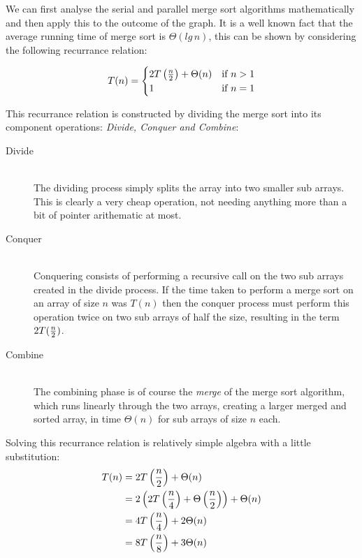 \documentclass[12pt,twoside,notitlepage]{report}
\begin{document}
We can first analyse the serial and parallel merge sort algorithms mathematically and then apply this to the outcome of the graph. It is a well known fact that the average running time of merge sort is $\Theta(lg\,{n})$, this can be
shown by considering the following recurrance relation:

\[
T(n) = 
    \begin{cases}
    2T\left({n \over 2}\right) + \Theta(n) & \text{if } n > 1 \\
    1 & \text{if } n = 1
    \end{cases}
\]

This recurrance relation is constructed by dividing the merge sort into its component operations: {\em Divide, Conquer and Combine}:

\begin{description}

\item[Divide] \hfill \\
The dividing process simply splits the array into two smaller sub arrays. This is clearly a very cheap operation, not needing anything more than a bit of pointer arithematic at most.

\item[Conquer] \hfill \\
Conquering consists of performing a recursive call on the two sub arrays created in the divide process. If the time taken to perform a merge sort on an array of size $n$ was $T(n)$ then the conquer process must perform this operation
twice on two sub arrays of half the size, resulting in the term $2T({n \over 2})$.

\item[Combine] \hfill \\
The combining phase is of course the {\em merge} of the merge sort algorithm, which runs linearly through the two arrays, creating a larger merged and sorted array, in time $\Theta(n)$ for sub arrays of size $n$ each.

\end{description}

Solving this recurrance relation is relatively simple algebra with a little substitution:
\begin{align*}
T(n) &= 2T\left({n \over 2}\right) + \Theta(n) \\
&= 2\left(2T\left({n \over 4}\right) + \Theta\left({n \over 2}\right)\right) + \Theta(n) \\
&= 4T\left({n \over 4}\right) + 2\Theta(n) \\
&= 8T\left({n \over 8}\right) + 3\Theta(n) \\
\end{align*}
\end{document}

